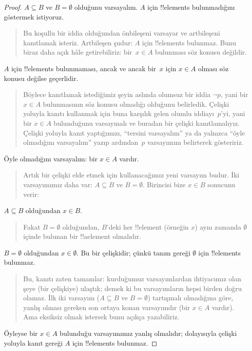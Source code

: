 \documentclass[../../../include/open-logic-section]{subfiles}
\begin{document}
\begin{proof}
  $A \subseteq B$ ve $B = \emptyset$ olduğunu varsayalım. $A$ için
  !!{element}s bulunmadığını göstermek istiyoruz.
  \begin{quote}
    Bu koşullu bir iddia olduğundan önbileşeni varsayar ve artbileşeni
    kanıtlamak isteriz. Artbileşen şudur: $A$ için !!{element}s
    bulunmaz. Bunu biraz daha açık hâle getirebiliriz: bir~$x \in A$
    bulunması söz konusu değildir.
  \end{quote}
  $A$ için !!{element}s bulunmaması, ancak ve ancak bir~$x$ için $x \in A$
  olması söz konusu değilse geçerlidir.
  \begin{quote}
    Böylece kanıtlamak istediğimiz şeyin aslında olumsuz bir iddia
    $\lnot p$, yani bir $x \in A$ bulunmasının söz konusu olmadığı
    olduğunu belirledik. Çelişki yoluyla kanıtı kullanmak için buna
    karşılık gelen olumlu iddiayı~$p$'yi, yani bir $x \in A$ bulunduğunu
    varsaymalı ve buradan bir çelişki kanıtlamalıyız. Çelişki yoluyla
    kanıt yaptığımızı, ``tersini varsayalım'' ya da yalnızca ``öyle
    olmadığını varsayalım'' yazıp ardından~$p$ varsayımını belirterek
    gösteririz.
  \end{quote}
  Öyle olmadığını varsayalım: bir $x \in A$ vardır.
  \begin{quote}
    Artık bir çelişki elde etmek için kullanacağımız yeni varsayım
    budur. İki varsayımımız daha var: $A \subseteq B$ ve $B =
    \emptyset$. Birincisi bize $x \in B$ sonucunu verir:
  \end{quote}
  $A \subseteq B$ olduğundan $x \in B$.
  \begin{quote}
    Fakat $B = \emptyset$ olduğundan, $B$'deki her !!{element} (örneğin
    $x$) aynı zamanda $\emptyset$ içinde bulunan bir !!a{element} olmalıdır.
  \end{quote}
  $B = \emptyset$ olduğundan $x \in \emptyset$. Bu bir çelişkidir;
  çünkü tanım gereği $\emptyset$ için !!{element}s bulunmaz.
  \begin{quote}
    Bu, kanıtı zaten tamamlar: kurduğumuz varsayımlardan ihtiyacımız
    olan şeye (bir çelişkiye) ulaştık; demek ki bu varsayımların hepsi
    birden doğru olamaz. İlk iki varsayım ($A \subseteq B$ ve $B =
    \emptyset$) tartışmalı olmadığına göre, yanlış olması gereken son
    ortaya konan varsayımdır (bir $x \in A$ vardır). Ama eksiksiz olmak
    istersek bunu açıkça yazabiliriz.
  \end{quote}
  Öyleyse bir $x \in A$ bulunduğu varsayımımız yanlış olmalıdır;
  dolayısıyla çelişki yoluyla kanıt gereği $A$ için !!{element}s
  bulunmaz.
\end{proof}
\end{document}

